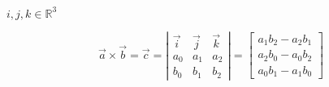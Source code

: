 \documentclass{article}
\begin{document}
$ i, j, k \in \mathbb{R}^3 $


\begin{equation}
  \vec{a} \times \vec{b} = \vec{c} =
  \left| \begin{array}{ccc}
    \vec{i}   & \vec{j}   & \vec{k}   \\
    a_0       & a_1       & a_2       \\
    b_0       & b_1       & b_2
  \end{array} \right|
=
  \left[ \begin{array}{ccc}
    a_1 b_2 - a_2 b_1     \\
    a_2 b_0 - a_0 b_2    \\
    a_0 b_1 - a_1 b_0
  \end{array} \right]
\end{equation}
\end{document}

